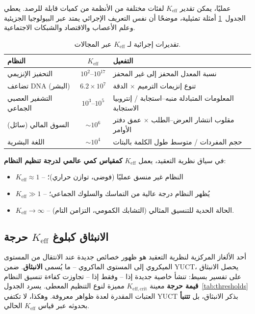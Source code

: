 \documentclass[11pt,a4paper]{article}
\theoremstyle{remark}
\newcommand{\Keff}{K_{\mathrm{eff}}}
\newcommand{\Keffcrit}{K_{\mathrm{eff},\text{crit}}}
\begin{document}
	عمليًا، يمكن تقدير \(\Keff\) لفئات مختلفة من الأنظمة من كميات قابلة للرصد. يعطي الجدول~\ref{tab:keff_examples} أمثلة تمثيلية، موضحًا أن نفس التعريف الإجرائي يمتد عبر البيولوجيا الجزيئية وعلم الأعصاب والاقتصاد والشبكات الاجتماعية.
	
	\begin{table}[H]
		\centering
		\caption{تقديرات إجرائية لـ \(\Keff\) عبر المجالات.}
		\label{tab:keff_examples}
		\begin{tabular}{l c l}
			\toprule
			\textbf{النظام} & \(\Keff\) & \textbf{التفعيل} \\
			\midrule
			التحفيز الإنزيمي & \(10^2\)--\(10^{17}\) & نسبة المعدل المحفز إلى غير المحفز \\
			تضاعف DNA (البشر) & \(6.2\times10^7\) & تنوع إنزيمات الترميم \(\times\) الدقة \\
			التشفير العصبي الجماعي & \(10^3\)--\(10^5\) & المعلومات المتبادلة منبه–استجابة / إنتروبيا الاستجابة \\
			السوق المالي (سائل) & \(\sim 10^6\) & مقلوب انتشار العرض–الطلب \(\times\) عمق دفتر الأوامر \\
			اللغة البشرية & \(\sim 10^4\) & حجم المفردات / متوسط طول الكلمة بالبتات \\
			\bottomrule
		\end{tabular}
	\end{table}
	
	في سياق نظرية التعقيد، يعمل \(\Keff\) \textbf{كمقياس كمي عالمي لدرجة تنظيم النظام}:
	\begin{itemize}
		\item \(\Keff \approx 1\) – النظام غير منسق عمليًا (فوضى، توازن حراري)؛
		\item \(\Keff \gg 1\) – يُظهر النظام درجة عالية من التماسك والسلوك الجماعي؛
		\item \(\Keff \to \infty\) – الحالة الحدية للتنسيق المثالي (التشابك الكمومي، التزامن التام).
	\end{itemize}
	
	\subsection{الانبثاق كبلوغ \(\Keff\) حرجة}
	
	أحد الألغاز المركزية لنظرية التعقيد هو ظهور خصائص جديدة عند الانتقال من المستوى الميكروي إلى المستوى الماكروي – ما يُسمى \textbf{الانبثاق}. ضمن YUCT، يحصل الانبثاق على تفسير بسيط: تنشأ خاصية جديدة إذا – وفقط إذا – تجاوزت كفاءة تنسيق النظام \textbf{قيمة حرجة} معينة \(\Keffcrit\) مميزة لنوع التنظيم المعطى. يسرد الجدول~\ref{tab:thresholds} العتبات المقدرة لعدة ظواهر معروفة. وهكذا، لا تكتفي YUCT بذكر الانبثاق، بل \textbf{تتنبأ} بحدوثه عبر قياس \(\Keff\) الحالي.
	
\end{document}
